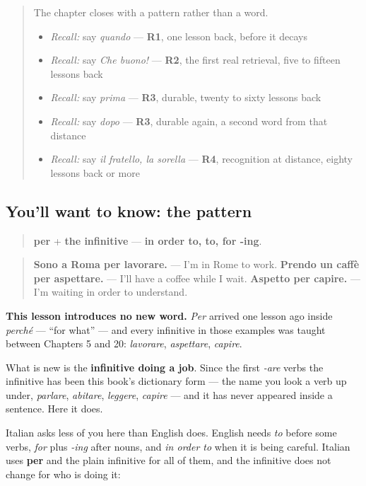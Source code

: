\begin{quote}
The chapter closes with a pattern rather than a word.

\begin{itemize}
\raggedright
  \item \emph{Recall:} say \emph{quando} — \textbf{R1}, one lesson back, before it decays
  \item \emph{Recall:} say \emph{Che buono!} — \textbf{R2}, the first real retrieval, five to fifteen lessons back
  \item \emph{Recall:} say \emph{prima} — \textbf{R3}, durable, twenty to sixty lessons back
  \item \emph{Recall:} say \emph{dopo} — \textbf{R3}, durable again, a second word from that distance
  \item \emph{Recall:} say \emph{il fratello, la sorella} — \textbf{R4}, recognition at distance, eighty lessons back or more
\end{itemize}
\end{quote}

\subsection*{You'll want to know: the pattern}
\begin{quote}
\textbf{per} + \textbf{the infinitive} — \textbf{in order to, to, for -ing}.
\end{quote}

\begin{quote}
\textbf{Sono a Roma per lavorare.} — I'm in Rome to work. \textbf{Prendo un caffè per aspettare.} — I'll have a coffee while I wait. \textbf{Aspetto per capire.} — I'm waiting in order to understand.
\end{quote}

\textbf{This lesson introduces no new word.} \emph{Per} arrived one lesson ago inside \emph{perché} — \textquotedblleft{}for what\textquotedblright{} — and every infinitive in those examples was taught between Chapters 5 and 20: \emph{lavorare}, \emph{aspettare}, \emph{capire}.

What is new is the \textbf{infinitive doing a job}. Since the first \emph{-are} verbs the infinitive has been this book's dictionary form — the name you look a verb up under, \emph{parlare}, \emph{abitare}, \emph{leggere}, \emph{capire} — and it has never appeared inside a sentence. Here it does.

Italian asks less of you here than English does. English needs \emph{to} before some verbs, \emph{for} plus \emph{-ing} after nouns, and \emph{in order to} when it is being careful. Italian uses \textbf{per} and the plain infinitive for all of them, and the infinitive does not change for who is doing it:

